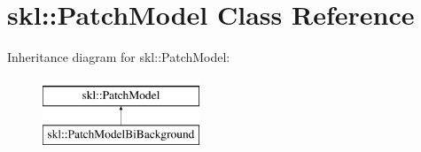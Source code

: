 \hypertarget{classskl_1_1_patch_model}{}\section{skl\+:\+:Patch\+Model Class Reference}
\label{classskl_1_1_patch_model}
Inheritance diagram for skl\+:\+:Patch\+Model\+:\begin{figure}[H]
\begin{center}
\leavevmode
\includegraphics[height=2.000000cm]{classskl_1_1_patch_model}
\end{center}
\end{figure}
